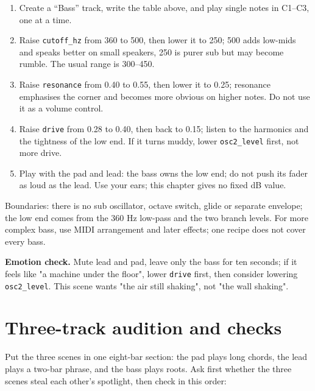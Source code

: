 \begin{enumerate}
  \item Create a ``Bass'' track, write the table above, and play single notes in C1--C3, one at a time.
  \item Raise \texttt{cutoff\_hz} from 360 to 500, then lower it to 250; 500 adds low-mids and speaks better on small speakers, 250 is purer sub but may become rumble. The usual range is 300--450.
  \item Raise \texttt{resonance} from 0.40 to 0.55, then lower it to 0.25; resonance emphasises the corner and becomes more obvious on higher notes. Do not use it as a volume control.
  \item Raise \texttt{drive} from 0.28 to 0.40, then back to 0.15; listen to the harmonics and the tightness of the low end. If it turns muddy, lower \texttt{osc2\_level} first, not more drive.
  \item Play with the pad and lead: the bass owns the low end; do not push its fader as loud as the lead. Use your ears; this chapter gives no fixed dB value.
\end{enumerate}

Boundaries: there is no sub oscillator, octave switch, glide or separate envelope; the low end comes from the 360 Hz low-pass and the two branch levels. For more complex bass, use MIDI arrangement and later effects; one recipe does not cover every bass.


\noindent\textbf{Emotion check.} Mute lead and pad, leave only the bass for ten seconds; if it feels like "a machine under the floor", lower \texttt{drive} first, then consider lowering \texttt{osc2\_level}. This scene wants "the air still shaking", not "the wall shaking".

\section{Three-track audition and checks}

Put the three scenes in one eight-bar section: the pad plays long chords, the lead plays a two-bar phrase, and the bass plays roots. Ask first whether the three scenes steal each other's spotlight, then check in this order:

